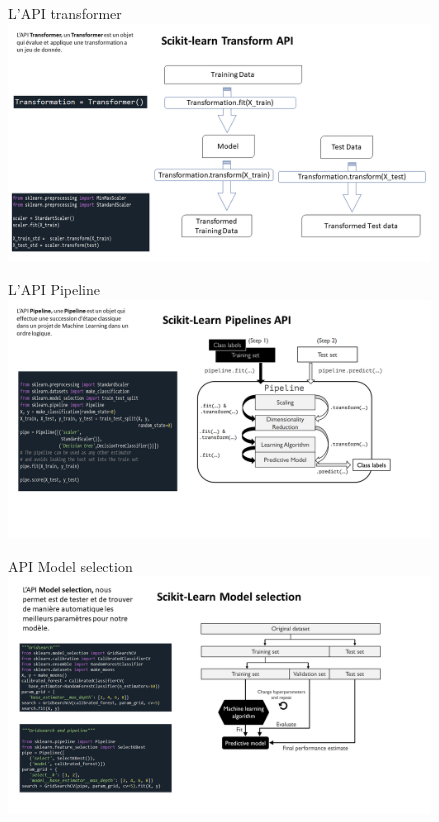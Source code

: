 \documentclass[9pt]{beamer}
\begin{document}
\begin{frame}{L'API transformer}
\includegraphics[height=6.3cm]{Diapositive7.PNG}
\end{frame}


\begin{frame}{L'API Pipeline}
\includegraphics[height=6.3cm]{Diapositive8.PNG}
\end{frame}


\begin{frame}{API Model selection}
\includegraphics[height=6.3cm]{Diapositive9.PNG}
\end{frame}
\end{document}
